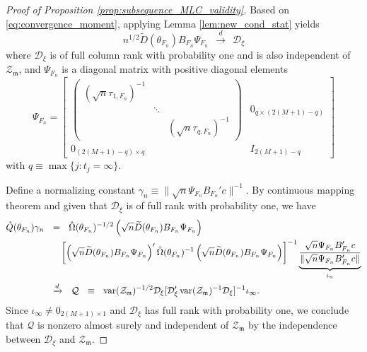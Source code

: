 \documentclass[11pt]{article}
\theoremstyle{definition}
\DeclareMathOperator{\var}{var}
\newcommand{\0}{\ensuremath{\mathbf{0}}}
\begin{document}
\begin{bibunit}
\begin{proof}[Proof of Proposition \ref{prop:subsequence_MLC_validity}]
%

Based on \eqref{eq:convergence_moment}, applying Lemma \ref{lem:new_cond_stat} yields
\[
	n^{1/2}\widetilde{D}(\theta_{F_n}) B_{F_n} \Psi_{F_n} 
	~~\xrightarrow{d}~~
	\mathcal{D}_\xi
\]
where $\mathcal{D}_\xi$ is of full column rank with probability one and is also independent of $\mathcal{Z}_{\mathfrak{m}}$, and $\Psi_{F_n}$ is a diagonal matrix with positive diagonal elements 
\begin{equation}
\label{eq:defn_S}
		\Psi_{F_n} = 
		\begin{bmatrix}
		\begin{pmatrix}
		(\sqrt{n}\tau_{1,F_n})^{-1} & & \\
		& \ddots & \\
		& & (\sqrt{n}\tau_{q,F_n})^{-1} 
		\end{pmatrix} & 0_{q\times (2(M+1) - q)} \\
		0_{(2(M+1) - q)\times q} & I_{2(M+1) - q}
		\end{bmatrix}
\end{equation}
with $q \equiv \max\{j: t_j = \infty\}$.

%
	Define a normalizing constant $\gamma_n \equiv \|\sqrt{n} \Psi_{F_n} B_{F_n}'c\|^{-1}$. 
%
%
%
%
%
%
	 By continuous mapping theorem and given that $\mathcal{D}_\xi$ is of full rank with probability one, we have
	\begin{align}
		\hat{Q}(\theta_{F_n}) \gamma_n
		&~~=~~ 
		\hat{\Omega}(\theta_{F_n})^{-1/2}\left(\sqrt{n}\widetilde{D}(\theta_{F_n})B_{F_n} \Psi_{F_n} \right) \notag \\
		&~~\quad \left[\left(\sqrt{n}\widetilde{D}(\theta_{F_n})B_{F_n} \Psi_{F_n}\right)'\hat{\Omega}(\theta_{F_n})^{-1} \left(\sqrt{n}\widetilde{D}(\theta_{F_n})B_{F_n} \Psi_{F_n}\right)\right]^{-1}\underbrace{\frac{\sqrt{n} \Psi_{F_n} B_{F_n}' c}{\|\sqrt{n} \Psi_{F_n} B_{F_n}'c\|}}_{\iota_n} \notag \\
		&~~\xrightarrow{d}~~
		\mathcal{Q} ~~\equiv~~
			 \var(\mathcal{Z}_{\mathfrak{m}})^{-1/2}\mathcal{D}_\xi [\mathcal{D}_\xi'\var(\mathcal{Z}_{\mathfrak{m}})^{-1}\mathcal{D}_\xi ]^{-1} \iota_\infty.
		\label{eq:convergence_Q}
	\end{align}
Since $\iota_\infty \neq 0_{2(M+1)\times 1}$ and $\mathcal{D}_\xi$ has full rank with probability one, we conclude that $\mathcal{Q}$ is nonzero almost surely and  independent of $\mathcal{Z}_{\mathfrak{m}}$ by the independence between $\mathcal{D}_\xi$ and $\mathcal{Z}_{\mathfrak{m}}$.
	

\end{proof}
\end{bibunit}
\end{document}
